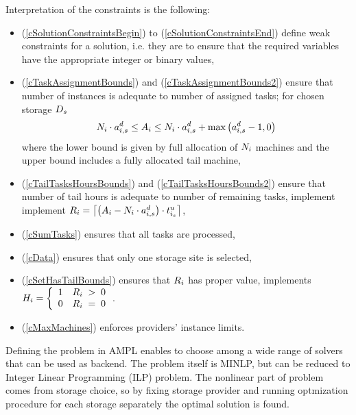 {  Interpretation of the constraints is the following:
  \begin{itemize}
      \item(\ref{cSolutionConstraintsBegin}) to
      (\ref{cSolutionConstraintsEnd}) define weak constraints for a solution, i.e. they are to ensure that the required variables have the appropriate integer or binary values,
      \item(\ref{cTaskAssignmentBounds}) and (\ref{cTaskAssignmentBounds2}) ensure that number of instances is adequate to number of assigned tasks; for chosen storage $\DataAssignment_s$
      \begin{align*}
          \NumberInstances_i \cdot \tasksPerDeadline_{i,s} \leq \TaskAssignment_i \leq \NumberInstances_i \cdot \tasksPerDeadline_{i,s} + \max\left(\tasksPerDeadline_{i,s} - 1, 0\right)
      \end{align*} where the lower bound is given by full allocation of $\NumberInstances_i$ machines and the upper bound includes a fully allocated tail machine,
      \item(\ref{cTailTasksHoursBounds}) and (\ref{cTailTasksHoursBounds2})
      ensure that number of tail hours is adequate to number of remaining
      tasks, implement implement $\TailTaskHours_i = \ceil*{\left(\TaskAssignment_i - \NumberInstances_i \cdot \tasksPerDeadline_{i,s}\right) \cdot \unitTime_{i_s}}$,
      \item(\ref{cSumTasks}) ensures that all tasks are processed,
      \item(\ref{cData}) ensures that only one storage site is selected,
      \item(\ref{cSetHasTailBounds}) ensures that $\TailTaskHours_i$ has proper value,
      implements $\HasTail_i = \left\{\begin{array}{cc} 1 & \TailTaskHours_i\; >\; 0 \\ 0 & \TailTaskHours_i\; =\; 0 \end{array}\right.$. %
      \item(\ref{cMaxMachines}) enforces providers' instance limits. 
  \end{itemize}

  Defining the problem in AMPL enables to choose among a wide range of solvers that can be used as backend. The problem itself is MINLP, but can be reduced to Integer Linear Programming (ILP) problem. The nonlinear part of problem comes from storage choice, so by fixing storage provider and running optmization procedure for each storage separately the optimal solution is found.

}
